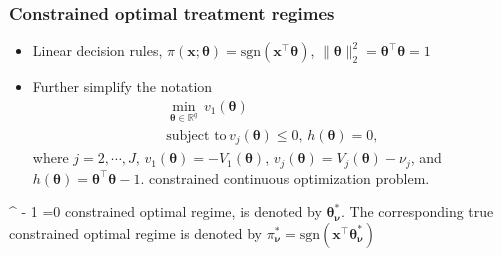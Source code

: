 \documentclass[unknownkeysallowed]{beamer}
\newcommand{\itl}{\intercal}
\newcommand{\bs}{ \boldsymbol}
\newcommand{\mb}{\mathbb}
\newcommand{\lt}{\left}
\newcommand{\rt}{\right}
\begin{document}
\begin{frame}
\frametitle{Constrained optimal treatment regimes}
\begin{itemize}
	\item Linear decision rules,
$\pi(\bs{x};\bs{\theta})=\text{sgn}(\bs{x}^{\itl}\bs{\theta})$, $\| \bs{\theta}
\|_2^2=\bs{\theta}^{\itl}\bs{\theta}=1$
	\item Further simplify the notation 
 \begin{equation*}
 \begin{gathered}
 \min_{\bs{\theta} \in \mb{R}^q} \, v_1(\bs{\theta}) \\ 
 \text{subject to}  \, v_j(\bs{\theta}) \le 0,\, h\lt(\bs{\theta}\rt)=0,
 \end{gathered}
 \end{equation*}
 where  $j = 2, \cdots, J$, $v_1\lt(\bs{\theta}\rt)=- V_1\lt(\bs{\theta}\rt)$, 
$v_j\lt(\bs{\theta}\rt) = V_j\lt(\bs{\theta}\rt) - \nu_j$, and
$h\lt(\bs{\theta}\rt) = \bs{\theta}^{\itl}\bs{\theta}-1$.
constrained continuous optimization problem. 
 \end{itemize}
 \end{frame} 
\bs{\theta}^{\itl}\bs{\theta} - 1 =0
constrained optimal regime, is denoted by $\bs{\theta}_{\bs{\nu}}^*$. The
corresponding true constrained optimal regime is denoted by $\pi_{\bs{\nu}}^* =
\text{sgn}(\bs{x}^{\itl}\bs{\theta}_{\bs{\nu}}^*)$
\end{document}
